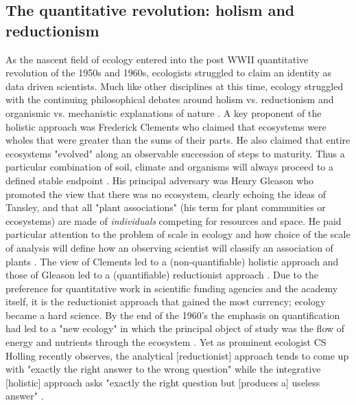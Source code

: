 \subsection{The quantitative revolution: holism and reductionism}
As the nascent field of ecology entered into the post WWII quantitative revolution of the 1950s and 1960s, ecologists struggled to claim an identity as data driven scientists. Much like other disciplines at this time, ecology struggled with the continuing philosophical debates around holism vs. reductionism and organismic vs. mechanistic explanations of nature \cite{barbour_1996}. A key proponent of the holistic approach was Frederick Clements who claimed that ecosystems were wholes that were greater than the sums of their parts. He also claimed that entire ecosystems "evolved" along an observable succession of steps to maturity. Thus a particular combination of soil, climate and organisms will always proceed to a defined stable endpoint \cite{clements_1936}. His principal adversary was Henry Gleason who promoted the view that there was no ecosystem, clearly echoing the ideas of Tansley, and that all "plant associations" (his term for plant communities or ecosystems) are made of \textit{individuals} competing for resources and space. He paid particular attention to the problem of scale in ecology and how choice of the scale of analysis will define how an observing scientist will classify an association of plants \cite{gleason_1939}. The view of Clements led to a (non-quantifiable) holistic approach and those of Gleason led to a (quantifiable) reductionist approach \cite{barbour_1996,worster_1977}. Due to the preference for quantitative work in scientific funding agencies and the academy itself, it is the reductionist approach that gained the most currency; ecology became a hard science. By the end of the 1960's the emphasis on quantification had led to a "new ecology" in which the principal object of study was the flow of energy and nutrients through the ecosystem \cite{worster_1977}.  Yet as prominent ecologist CS Holling recently observes, the analytical [reductionist] approach tends to come up with "exactly the right answer to the wrong question" while the integrative [holistic] approach asks "exactly the right question but [produces a] useless answer" \cite[][p. 3]{holling_1998}.

